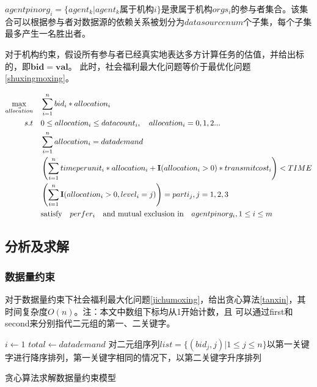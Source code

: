 \documentclass[promaster]{thesis-uestc}
\begin{document}
$agentpinorg_i=\{agent_k|agent_k属于机构i\}$是隶属于机构$orgs_i$的参与者集合。该集合可以根据参与者对数据源的依赖关系被划分为$datasourcenum$个子集，每个子集最多产生一名胜出者。

对于机构约束，假设所有参与者已经真实地表达多方计算任务的估值，并给出标的，即$\mathbf{bid} = \mathbf{val}$。 此时，社会福利最大化问题等价于最优化问题\ref{shuxingmoxing}。

\begin{align}
    \label{shuxingmoxing}\max_{\vec{allocation}} \quad&\sum_{i=1}^{n}{bid_i*allocation_i}\\
    s.t\quad& 0\leq allocation_i\leq datacount_i,\quad allocation_i = {0,1,2...}\notag\\
        \quad& \sum_{i=1}^{n}{allocation_i} = datademand\notag\\
        \quad& \left(\sum_{i=1}^{n}{timeperunit_i*allocation_i+\mathbf{I}(allocation_i > 0)*transmitcost_i}\right) < TIME\notag\\
        \quad& \left(\sum_{i=1}^{n}{\mathbf{I}(allocation_i > 0,level_i = j)}\right)=parti_j, j = {1,2,3}\notag\\
        \quad& \text{satisfy}\quad perfer_i \quad \text{and mutual exclusion in}\quad agentpinorg_i, 1\leq i\leq m \notag
\end{align}

\FloatBarrier

\subsection{分析及求解}

\subsubsection{数据量约束}

对于数据量约束下社会福利最大化问题\ref{jichumoxing}，给出贪心算法\ref{tanxin}，其时间复杂度$O(n)$。注：本文中数组下标均从1开始计数，且
可以通过first和second来分别指代二元组的第一、二关键字。

\begin{algorithm}[h] 
    $i \leftarrow 1$\;
    $total \leftarrow datademand $\;
    对二元组序列$list = \{(bid_j,j)|1 \leq j \leq n\}$以第一关键字进行降序排列，第一关键字相同的情况下，以第二关键字升序排列\;
\caption{贪心算法求解数据量约束模型}
\label{tanxin}
\end{algorithm}
\end{document}
